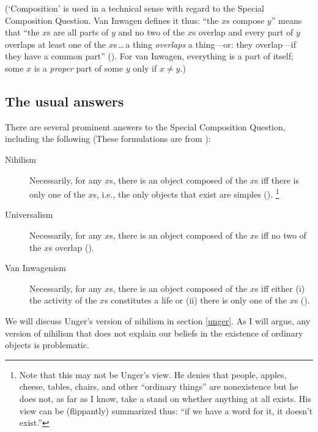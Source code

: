 \documentclass[11pt]{standalone}
\begin{document}
\begin{spacing}{1.5}
(`Composition' is used in a technical sense with regard to the Special
Composition Question.  Van Inwagen defines it thus: ``the $x$s compose
$y$'' means that ``the $x$s are all parts of $y$ and no two of the
$x$s overlap and every part of $y$ overlaps at least one of the
$x$s\,\ldots\,a thing {\em overlaps} a thing---or: they overlap---if
they have a common part'' (\citeyear[29]{inwagen1995}).  For van
Inwagen, everything is a part of itself; some $x$ is a {\em proper}
part of some $y$ only if $x \neq y$.)

\subsection{The usual answers}
\label{scq-ans}
There are several prominent answers to the Special Composition
Question, including the following (These formulations are from
\citet{markosian1998a}):
\begin{description}
	\item[Nihilism] Necessarily, for any $x$s, there is an object
          composed of the $x$s iff there is only one of the $x$s,
          i.e., the only objects that exist are
          simples (\citeyear[219]{markosian1998a}).
	\footnote{\label{flip} Note that this may not be Unger's view.
          He denies that people, apples, cheese, tables, chairs, and
          other ``ordinary things'' are nonexistence but he does not,
          as far as I know, take a stand on whether anything at all
          exists.  His view can be (flippantly) summarized thus: ``if
          we have a word for it, it doesn't exist.''}
	\item[Universalism] Necessarily, for any $x$s, there is an
          object composed of the $x$s iff no two of the $x$s
          overlap (\citeyear[227]{markosian1998a}).
	\item[Van Inwagenism] Necessarily, for any $x$s, there is an
          object composed of the $x$s iff either (i) the activity of
          the $x$s constitutes a life or (ii) there is only one of the
          $x$s (\citeyear[221]{markosian1998a}).
\end{description}

We will discuss Unger's version of nihilism in section \ref{unger}.
As I will argue, any version of nihilism that does not explain our
beliefs in the existence of ordinary objects is problematic.


\end{spacing}
\end{document}
